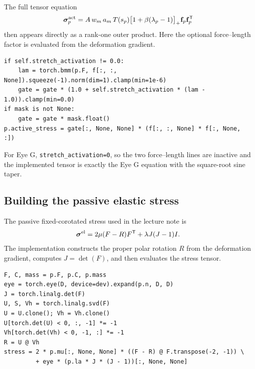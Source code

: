 \documentclass[11pt]{article}
\begin{document}
The full tensor equation
\begin{equation}
\boldsymbol{\sigma}^{\rm act}_p
=
A\,w_m\,a_m\,T(s_p)
\bigl[1+\beta(\lambda_p-1)\bigr]_+
\mathbf f_p\mathbf f_p^{\mathsf T}
\label{eq:auto27}
\end{equation}
then appears directly as a rank-one outer product. Here the optional force--length factor is evaluated from the deformation gradient.

\begin{lstlisting}[caption={\texttt{prototype/eye/muscle\_ops.py}: fibre stretch, force--length factor, and rank-one active stress.},label={lst:active-stress-code}]
if self.stretch_activation != 0.0:
    lam = torch.bmm(p.F, f[:, :, None]).squeeze(-1).norm(dim=1).clamp(min=1e-6)
    gate = gate * (1.0 + self.stretch_activation * (lam - 1.0)).clamp(min=0.0)
if mask is not None:
    gate = gate * mask.float()
p.active_stress = gate[:, None, None] * (f[:, :, None] * f[:, None, :])
\end{lstlisting}

For Eye G, \texttt{stretch\_activation=0}, so the two force--length lines are inactive and the implemented tensor is exactly the Eye G equation with the square-root sine taper.

\subsection{Building the passive elastic stress}

The passive fixed-corotated stress used in the lecture note is
\begin{equation}
\boldsymbol{\sigma}^{\rm el}
=
2\mu(F-R)F^{\mathsf T}
+
\lambda J(J-1)I.
\label{eq:auto28}
\end{equation}
The implementation constructs the proper polar rotation $R$ from the deformation gradient, computes $J=\det(F)$, and then evaluates the stress tensor.

\begin{lstlisting}[caption={\texttt{prototype/eye/muscle\_ops.py}: 3-D polar rotation and fixed-corotated stress for the muscle body.},label={lst:elastic-stress-code}]
F, C, mass = p.F, p.C, p.mass
eye = torch.eye(D, device=dev).expand(p.n, D, D)
J = torch.linalg.det(F)
U, S, Vh = torch.linalg.svd(F)
U = U.clone(); Vh = Vh.clone()
U[torch.det(U) < 0, :, -1] *= -1
Vh[torch.det(Vh) < 0, -1, :] *= -1
R = U @ Vh
stress = 2 * p.mu[:, None, None] * ((F - R) @ F.transpose(-2, -1)) \
         + eye * (p.la * J * (J - 1))[:, None, None]
\end{lstlisting}
\end{document}
